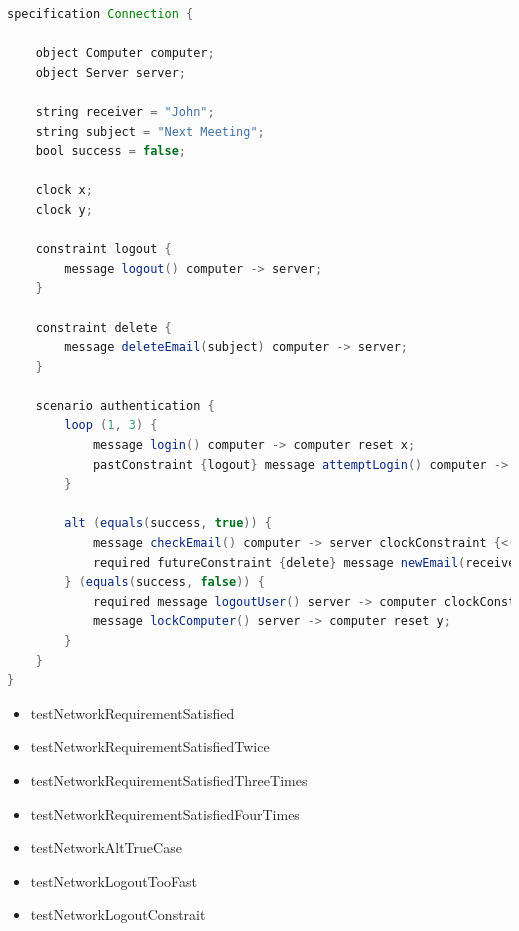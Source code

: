 \begin{lstlisting}[language=java, frame=single, float=ht!, caption={Integrációs teszteset.},captionpos=b]
specification Connection {

    object Computer computer;
    object Server server;

    string receiver = "John";
    string subject = "Next Meeting";
    bool success = false;

    clock x;
    clock y;

    constraint logout {
        message logout() computer -> server;
    }

    constraint delete {
        message deleteEmail(subject) computer -> server;
    }

    scenario authentication {
        loop (1, 3) {
            message login() computer -> computer reset x;
            pastConstraint {logout} message attemptLogin() computer -> server reset y;
        }

        alt (equals(success, true)) {
            message checkEmail() computer -> server clockConstraint {<(x, 2)};
            required futureConstraint {delete} message newEmail(receiver, subject) computer -> server reset x;
        } (equals(success, false)) {
            required message logoutUser() server -> computer clockConstraint {>(y, 3)};
            message lockComputer() server -> computer reset y;
        }
    }
}
\end{lstlisting}

\begin{itemize}
    \item testNetworkRequirementSatisfied
    \item testNetworkRequirementSatisfiedTwice
    \item testNetworkRequirementSatisfiedThreeTimes
    \item testNetworkRequirementSatisfiedFourTimes
    \item testNetworkAltTrueCase
    \item testNetworkLogoutTooFast
    \item testNetworkLogoutConstrait
\end{itemize}